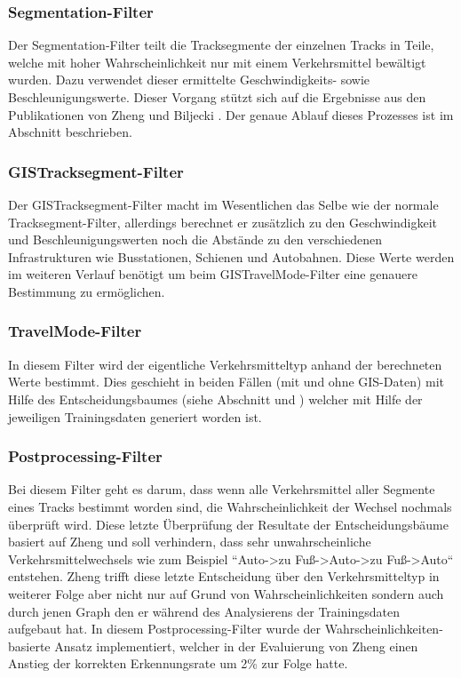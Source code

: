 
\subsubsection{Segmentation-Filter}
Der Segmentation-Filter teilt die Tracksegmente der einzelnen Tracks in Teile, welche mit hoher Wahrscheinlichkeit nur mit einem Verkehrsmittel bewältigt wurden. Dazu verwendet dieser ermittelte Geschwindigkeits- sowie Beschleunigungswerte. Dieser Vorgang stützt sich auf die Ergebnisse aus den Publikationen von Zheng \cite{zheng_understanding_2010} und Biljecki \cite{biljecki_transportation_2013}. Der genaue Ablauf dieses Prozesses ist im Abschnitt  beschrieben.

\subsubsection{GISTracksegment-Filter}
\label{gisTracksegmentFilter}
Der GISTracksegment-Filter macht im Wesentlichen das Selbe wie der normale Tracksegment-Filter, allerdings berechnet er zusätzlich zu den Geschwindigkeit und Beschleunigungswerten noch die Abstände zu den verschiedenen Infrastrukturen wie Busstationen, Schienen und Autobahnen. Diese Werte werden im weiteren Verlauf benötigt um beim GISTravelMode-Filter eine genauere Bestimmung zu ermöglichen.

\subsubsection{TravelMode-Filter}
In diesem Filter wird der eigentliche Verkehrsmitteltyp anhand der berechneten Werte bestimmt. Dies geschieht in beiden Fällen (mit und ohne GIS-Daten) mit Hilfe des Entscheidungsbaumes (siehe Abschnitt  und ) welcher mit Hilfe der jeweiligen Trainingsdaten generiert worden ist.

\subsubsection{Postprocessing-Filter}
Bei diesem Filter geht es darum, dass wenn alle Verkehrsmittel aller Segmente eines Tracks bestimmt worden sind, die Wahrscheinlichkeit der Wechsel nochmals überprüft wird. Diese letzte Überprüfung der Resultate der Entscheidungsbäume basiert auf Zheng \cite{zheng_understanding_2010} und soll verhindern, dass sehr unwahrscheinliche Verkehrsmittelwechsels wie zum Beispiel ``Auto->zu Fuß->Auto->zu Fuß->Auto`` entstehen. Zheng trifft diese letzte Entscheidung über den Verkehrsmitteltyp in weiterer Folge aber nicht nur auf Grund von Wahrscheinlichkeiten sondern auch durch jenen Graph den er während des Analysierens der Trainingsdaten aufgebaut hat. In diesem Postprocessing-Filter wurde der Wahrscheinlichkeiten-basierte Ansatz implementiert, welcher in der Evaluierung von Zheng einen Anstieg der korrekten Erkennungsrate um 2\% zur Folge hatte.

